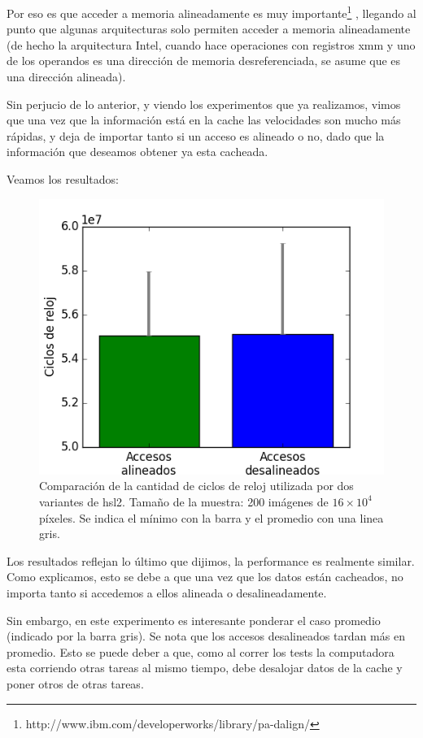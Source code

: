 Por eso es que acceder a memoria alineadamente es muy importante\footnote{http://www.ibm.com/developerworks/library/pa-dalign/} , llegando al punto que algunas arquitecturas solo permiten acceder a memoria alineadamente (de hecho la arquitectura Intel, cuando hace operaciones con registros xmm y uno de los operandos es una dirección de memoria desreferenciada, se asume que es una dirección alineada).

Sin perjucio de lo anterior, y viendo los experimentos que ya realizamos, vimos que una vez que la información está en la cache las velocidades son mucho más rápidas, y deja de importar tanto si un acceso es alineado o no, dado que la información que deseamos obtener ya esta cacheada.

Veamos los resultados:

\begin{figure}[H] 
	\centering
  \includegraphics[scale=0.7]{images/hsl-alineamiento.png}
  \caption{Comparación de la cantidad de ciclos de reloj utilizada por dos variantes de hsl2. Tamaño de la muestra: 200 imágenes de $16 \times 10^4$ píxeles. Se indica el mínimo con la barra y el promedio con una linea gris.}
\end{figure}

Los resultados reflejan lo último que dijimos, la performance es realmente similar. Como explicamos, esto se debe a que una vez que los datos están cacheados, no importa tanto si accedemos a ellos alineada o desalineadamente.

Sin embargo, en este experimento es interesante ponderar el caso promedio (indicado por la barra gris). Se nota que los accesos desalineados tardan más en promedio. Esto se puede deber a que, como al correr los tests la computadora esta corriendo otras tareas al mismo tiempo, debe desalojar datos de la cache y poner otros de otras tareas.

